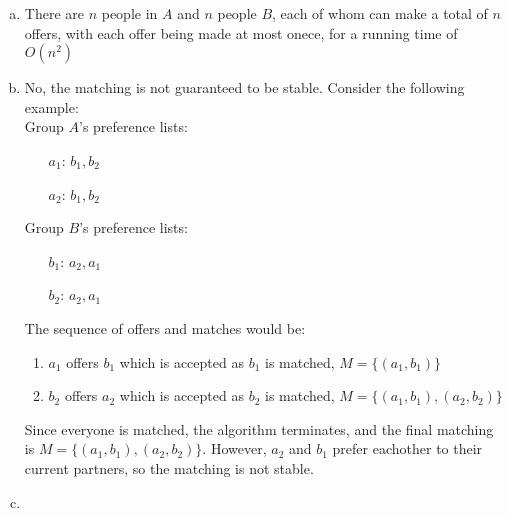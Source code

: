 \documentclass{article}
\begin{document}
\begin{enumerate}[a)]
    \item There are $n$ people in $A$ and $n$ people $B$, each of whom can make a total of $n$ offers, with each offer being made at most onece, for a running time of $O(n^2)$
    \item No, the matching is not guaranteed to be stable. Consider the following example: \\[0.75ex]
    Group $A$'s preference lists: 
    \begin{enumerate}
        \item[$a_1$:] $b_1, b_2$
        \item[$a_2$:] $b_1, b_2$
    \end{enumerate} 
    Group $B$'s preference lists: 
    \begin{enumerate}
        \item[$b_1$:] $a_2, a_1$
        \item[$b_2$:] $a_2, a_1$
    \end{enumerate} 
    The sequence of offers and matches would be: 
    \begin{enumerate}[1.]
        \item $a_1$ offers $b_1$ which is accepted as $b_1$ is matched, $M = \{(a_1, b_1)\}$
        \item $b_2$ offers $a_2$ which is accepted as $b_2$ is matched, $M = \{(a_1, b_1), (a_2, b_2)\}$
    \end{enumerate}
    Since everyone is matched, the algorithm terminates, and the final matching is $M = \{(a_1, b_1), (a_2, b_2)\}$. However, $a_2$ and $b_1$ prefer eachother to their current partners, so the matching is not stable. 
    \item 
\end{enumerate}
\end{document}
